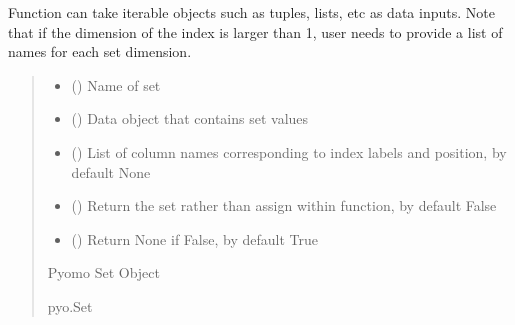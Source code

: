 \documentclass[letterpaper,10pt,english]{sphinxmanual}
\begin{document}
\begin{fulllineitems}
\begin{fulllineitems}
\sphinxAtStartPar
Function can take iterable objects such as tuples, lists, etc as data inputs. Note that if
the dimension of the index is larger than 1, user needs to provide a list of names for each
set dimension.
\begin{quote}\begin{description}
\begin{itemize}
\item {} 
\sphinxAtStartPar
{} () \textendash{} Name of set

\item {} 
\sphinxAtStartPar
{} () \textendash{} Data object that contains set values

\item {} 
\sphinxAtStartPar
{} (\sphinxstyleliteralemphasis{\sphinxupquote{ | }}\sphinxstyleliteralemphasis{\sphinxupquote{, }}) \textendash{} List of column names corresponding to index labels and position, by default None

\item {} 
\sphinxAtStartPar
{} (\sphinxstyleliteralemphasis{\sphinxupquote{ | }}\sphinxstyleliteralemphasis{\sphinxupquote{, }}) \textendash{} Return the set rather than assign within function, by default False

\item {} 
\sphinxAtStartPar
{} (\sphinxstyleliteralemphasis{\sphinxupquote{ | }}\sphinxstyleliteralemphasis{\sphinxupquote{, }}) \textendash{} Return None if False, by default True

\end{itemize}

\sphinxAtStartPar
Pyomo Set Object

\sphinxAtStartPar
pyo.Set


\end{description}
\end{quote}
\end{fulllineitems}
\end{fulllineitems}
\end{document}
